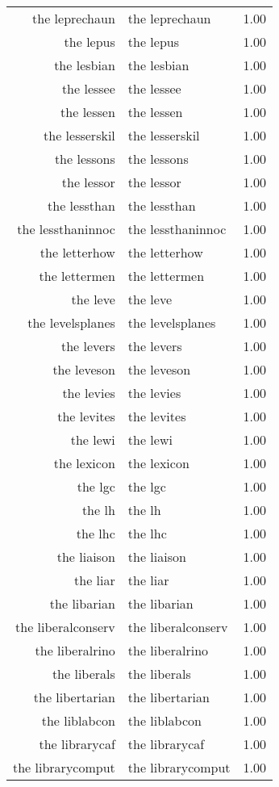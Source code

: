 \begin{table}[ht]
\begin{tabular}{rlr}
  the leprechaun & the leprechaun & 1.00 \\ 
  the lepus & the lepus & 1.00 \\ 
  the lesbian & the lesbian & 1.00 \\ 
  the lessee & the lessee & 1.00 \\ 
  the lessen & the lessen & 1.00 \\ 
  the lesserskil & the lesserskil & 1.00 \\ 
  the lessons & the lessons & 1.00 \\ 
  the lessor & the lessor & 1.00 \\ 
  the lessthan & the lessthan & 1.00 \\ 
  the lessthaninnoc & the lessthaninnoc & 1.00 \\ 
  the letterhow & the letterhow & 1.00 \\ 
  the lettermen & the lettermen & 1.00 \\ 
  the leve & the leve & 1.00 \\ 
  the levelsplanes & the levelsplanes & 1.00 \\ 
  the levers & the levers & 1.00 \\ 
  the leveson & the leveson & 1.00 \\ 
  the levies & the levies & 1.00 \\ 
  the levites & the levites & 1.00 \\ 
  the lewi & the lewi & 1.00 \\ 
  the lexicon & the lexicon & 1.00 \\ 
  the lgc & the lgc & 1.00 \\ 
  the lh & the lh & 1.00 \\ 
  the lhc & the lhc & 1.00 \\ 
  the liaison & the liaison & 1.00 \\ 
  the liar & the liar & 1.00 \\ 
  the libarian & the libarian & 1.00 \\ 
  the liberalconserv & the liberalconserv & 1.00 \\ 
  the liberalrino & the liberalrino & 1.00 \\ 
  the liberals & the liberals & 1.00 \\ 
  the libertarian & the libertarian & 1.00 \\ 
  the liblabcon & the liblabcon & 1.00 \\ 
  the librarycaf & the librarycaf & 1.00 \\ 
  the librarycomput & the librarycomput & 1.00 \\ 

\end{tabular}
\end{table}
